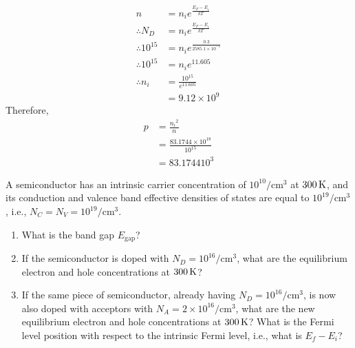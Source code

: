 \documentclass[fleqn, a4paper, 11pt, oneside]{amsart}
\theoremstyle{definition}
\theoremstyle{theorem}
\begin{document}
\begin{solution}
	\begin{align*}
		n                  & = n_i e^{\frac{E_F - E_i}{k T}}             \\
		\therefore N_D     & = n_i e^{\frac{E_F - E_i}{k T}}             \\
		\therefore 10^{15} & = n_i e^{\frac{0.3}{2585.1 \times 10^{-5}}} \\
		\therefore 10^{15} & = n_i e^{11.605}                            \\
		\therefore n_i     & = \frac{10^{15}}{e^{11.605}}                \\
                                   & = 9.12 \times 10^9
	\end{align*}
	Therefore,
	\begin{align*}
		p & = \frac{{n_i}^2}{n}                      \\
                  & = \frac{83.1744 \times 10^{18}}{10^{15}} \\
                  & = 83.1744 10^3
	\end{align*}
\end{solution}

\begin{question}
	A semiconductor has an intrinsic carrier concentration of $10^{10} \si{\per\centi\metre\cubed}$ at $300 \kelvin$, and its conduction and valence band effective densities of states are equal to $10^{19} \si{\per\centi\metre\cubed}$, i.e., $N_C = N_V = 10^{19} \si{\per\centi\metre\cubed}$.
	\begin{enumerate}
		\item
			What is the band gap $E_{\text{gap}}$?
		\item
			If the semiconductor is doped with $N_D = 10^{16} \si{\per\centi\metre\cubed}$, what are the equilibrium electron and hole concentrations at $300 \kelvin$?
		\item
			If the same piece of semiconductor, already having $N_D = 10^{16} \si{\per\centi\metre\cubed}$, is now also doped with acceptors with $N_A = 2 \times 10^{16} \si{\per\centi\metre\cubed}$, what are the new equilibrium electron and hole concentrations at $300 \kelvin$?
			What is the Fermi level position with respect to the intrinsic Fermi level, i.e., what is $E_f - E_i$?
	\end{enumerate}
\end{question}
\end{document}
